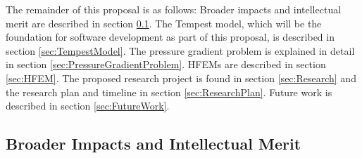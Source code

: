 \documentclass[11pt]{article}
\begin{document}
\vspace{-0.4cm}
The remainder of this proposal is as follows:  Broader impacts and intellectual merit are described in section \ref{sec:BroaderImpacts}.  The Tempest model, which will be the foundation for software development as part of this proposal, is described in section \ref{sec:TempestModel}.  The pressure gradient problem is explained in detail in section \ref{sec:PressureGradientProblem}.  HFEMs are described in section \ref{sec:HFEM}.  The proposed research project is found in section \ref{sec:Research} and the research plan and timeline in section \ref{sec:ResearchPlan}.  Future work is described in section \ref{sec:FutureWork}.


\subsection{Broader Impacts and Intellectual Merit} \label{sec:BroaderImpacts}
\end{document}
